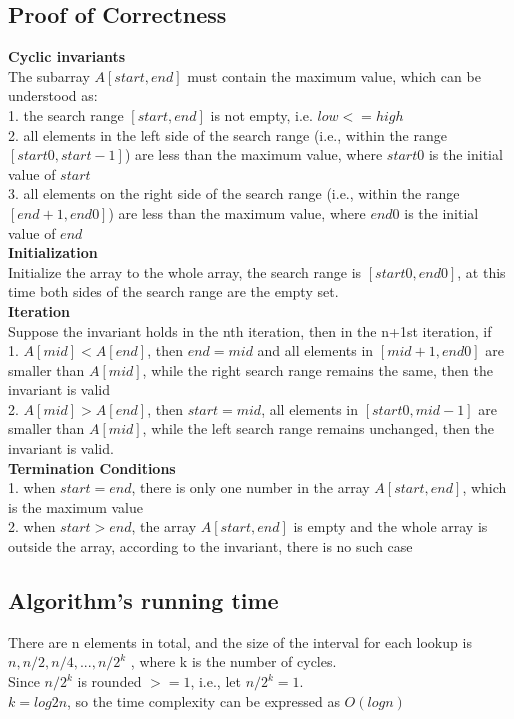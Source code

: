\documentclass{article}
\begin{document}
\subsection{Proof of Correctness}
\textbf{Cyclic invariants}\\
The subarray $A[start, end]$ must contain the maximum value, which can be understood as:\\
1. the search range $[start, end]$ is not empty, i.e. $low <= high$\\
2. all elements in the left side of the search range (i.e., within the range $[start0, start-1]$) are less than the maximum value, where $start0$ is the initial value of $start$\\
3. all elements on the right side of the search range (i.e., within the range $[end+1, end0]$) are less than the maximum value, where $end0$ is the initial value of $end$\\
\textbf{Initialization}\\
Initialize the array to the whole array, the search range is $[start0, end0]$, at this time both sides of the search range are the empty set.\\
\textbf{Iteration}\\
Suppose the invariant holds in the nth iteration, then in the n+1st iteration, if\\
1. $A[mid] < A[end]$, then $end=mid$ and all elements in $[mid+1, end0]$ are smaller than $A[mid]$, while the right search range remains the same, then the invariant is valid\\
2. $A[mid] > A[end]$, then $start=mid$, all elements in $[start0, mid-1]$ are smaller than $A[mid]$, while the left search range remains unchanged, then the invariant is valid.\\
\textbf{Termination Conditions}\\
1. when $start = end$, there is only one number in the array $A[start, end]$, which is the maximum value\\
2. when $start > end$, the array $A[start, end]$ is empty and the whole array is outside the array, according to the invariant, there is no such case

\subsection{Algorithm's running time}
There are n elements in total, and the size of the interval for each lookup is $n, n/2, n/4, ..., n/2^k$ , where k is the number of cycles.\\
Since $n/2^k$ is rounded $>= 1$, i.e., let $n/2^k = 1$.\\
$k=log2n$, so the time complexity can be expressed as $O(logn)$
\end{document}
